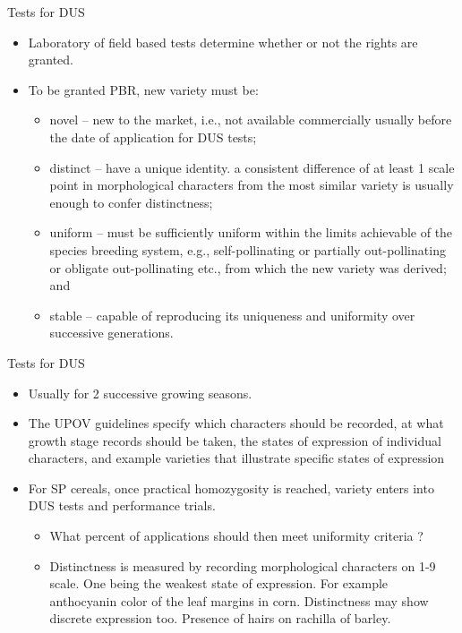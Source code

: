 \documentclass[ignorenonframetext,aspectratio=169]{beamer}
\providecommand{\tightlist}{%
  \setlength{\itemsep}{0pt}\setlength{\parskip}{0pt}}
\begin{document}
\begin{frame}{Tests for DUS}
\protect\hypertarget{tests-for-dus}{}

\begin{itemize}
\tightlist
\item
  Laboratory of field based tests determine whether or not the rights
  are granted.
\item
  To be granted PBR, new variety must be:

  \begin{itemize}
  \tightlist
  \item
    novel -- new to the market, i.e., not available commercially usually
    before the date of application for DUS tests;
  \item
    distinct -- have a unique identity. a consistent difference of at
    least 1 scale point in morphological characters from the most
    similar variety is usually enough to confer distinctness;
  \item
    uniform -- must be sufficiently uniform within the limits achievable
    of the species breeding system, e.g., self-pollinating or partially
    out-pollinating or obligate out-pollinating etc., from which the new
    variety was derived; and
  \item
    stable -- capable of reproducing its uniqueness and uniformity over
    successive generations.
  \end{itemize}
\end{itemize}

\end{frame}

\begin{frame}{Tests for DUS}
\protect\hypertarget{tests-for-dus-1}{}

\begin{itemize}
\tightlist
\item
  Usually for 2 successive growing seasons.
\item
  The UPOV guidelines specify which characters should be recorded, at
  what growth stage records should be taken, the states of expression of
  individual characters, and example varieties that illustrate specific
  states of expression
\item
  For SP cereals, once practical homozygosity is reached, variety enters
  into DUS tests and performance trials.

  \begin{itemize}
  \tightlist
  \item
    What percent of applications should then meet uniformity criteria ?
  \item
    Distinctness is measured by recording morphological characters on
    1-9 scale. One being the weakest state of expression. For example
    anthocyanin color of the leaf margins in corn. Distinctness may show
    discrete expression too. Presence of hairs on rachilla of barley.
  \end{itemize}
\end{itemize}

\end{frame}
\end{document}
